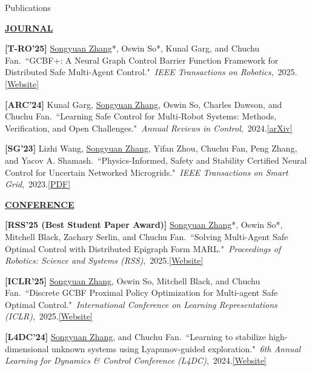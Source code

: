 \documentclass{resume} %
\newcommand{\paperItem}[4]{#1.~``#2."~\textit{#3},~#4.}%
\newcommand{\me}{\underline{Songyuan Zhang}}
\newcommand{\meshort}{\textbf{S. Zhang}}
\newcommand{\person}[2]{#1}
\begin{document}
	\begin{rSection}{Publications}
		\item[] \textbf{\underline{JOURNAL}}
		\vspace{5pt}
		{
			\item {\bf [T-RO'25]}
			\paperItem{\person{\me*}{\meshort}, \person{Oswin So*}{O. So}, \person{Kunal Garg}{K. Garg}, and \person{Chuchu Fan}{C. Fan}}{GCBF+: A Neural Graph Control Barrier Function Framework for Distributed Safe Multi-Agent Control}{IEEE Transactions on Robotics}{2025}{\href{https://mit-realm.github.io/gcbfplus/}{[Website]}}
			\item {\bf [ARC'24]}
			\paperItem{\person{Kunal Garg}{K. Garg}, \person{\me}{\meshort}, \person{Oswin So}{O. So}, \person{Charles Dawson}{C. Dawson}, and \person{Chuchu Fan}{C. Fan}}{Learning Safe Control for Multi-Robot Systems: Methods, Verification, and Open Challenges}{Annual Reviews in Control}{2024}{\href{https://arxiv.org/abs/2311.13714}{[arXiv]}}
			\item {\bf [SG'23]}
			\paperItem{\person{Lizhi Wang}{L. Wang}, \person{\me}{\meshort}, \person{Yifan Zhou}{Y. Zhou}, \person{Chuchu Fan}{C. Fan}, \person{Peng Zhang}{P. Zhang}, and \person{Yacov A. Shamash}{YA. Shamash}}{Physics-Informed, Safety and Stability Certified Neural Control for Uncertain Networked Microgrids}{IEEE Transactions on Smart Grid}{2023}{\href{https://ieeexplore.ieee.org/stamp/stamp.jsp?arnumber=10233047}{[PDF]}}
		}
		\vspace{5pt}
		\item[] \textbf{\underline{CONFERENCE}}
		\vspace{5pt}
		{	
			\item {\bf [RSS'25 (Best Student Paper Award)]}
			\paperItem{\person{\me*}{\meshort}, \person{Oswin So*}{O. So}, \person{Mitchell Black}{M. Black}, \person{Zachary Serlin}{Z. Serlin}, and \person{Chuchu Fan}{C. Fan}}{Solving Multi-Agent Safe Optimal Control with Distributed Epigraph Form MARL}{Proceedings of Robotics: Science and Systems (RSS)}{2025}{\href{https://mit-realm.github.io/def-marl/}{[Website]}}
			\item {\bf [ICLR'25]}
			\paperItem{\person{\me}{\meshort}, \person{Oswin So}{O. So}, \person{Mitchell Black}{M. Black}, and \person{Chuchu Fan}{C. Fan}}{Discrete GCBF Proximal Policy Optimization for Multi-agent Safe Optimal Control}{International Conference on Learning Representations (ICLR)}{2025}{\href{https://mit-realm.github.io/dgppo/}{[Website]}}
			\item {\bf [L4DC'24]}
			\paperItem{\person{\me}{\meshort}, and \person{Chuchu Fan}{C. Fan}}{Learning to stabilize high-dimensional unknown systems using Lyapunov-guided exploration}{6th Annual Learning for Dynamics \& Control Conference (L4DC)}{2024}{\href{https://mit-realm.github.io/lyge-website/}{[Website]}}
}
\end{rSection}
\end{document}
